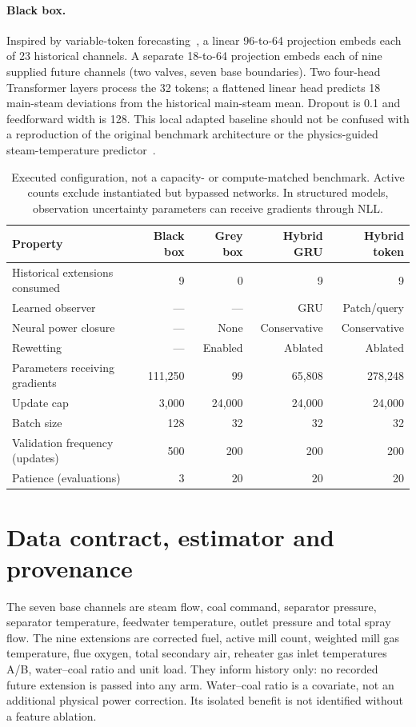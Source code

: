 \paragraph{Black box.}
Inspired by variable-token forecasting~\cite{liu2024itransformer}, a linear
96-to-64 projection embeds each of 23 historical channels. A separate 18-to-64
projection embeds each of nine supplied future channels (two valves, seven
base boundaries). Two four-head Transformer layers process the 32 tokens;
a flattened linear head predicts 18 main-steam deviations from the historical
main-steam mean. Dropout is 0.1 and feedforward width is 128. This local adapted
baseline should not be confused with a reproduction of the original benchmark
architecture or the physics-guided steam-temperature predictor~\cite{zhang2026sst}.

\begin{table}[!ht]
\centering\small
\begin{tabular}{lrrrr}
\toprule
Property & Black box & Grey box & Hybrid GRU & Hybrid token\\
\midrule
Historical extensions consumed & 9 & 0 & 9 & 9\\
Learned observer & --- & --- & GRU & Patch/query\\
Neural power closure & --- & None & Conservative & Conservative\\
Rewetting & --- & Enabled & Ablated & Ablated\\
Parameters receiving gradients & 111,250 & 99 & 65,808 & 278,248\\
Update cap & 3,000 & 24,000 & 24,000 & 24,000\\
Batch size & 128 & 32 & 32 & 32\\
Validation frequency (updates) & 500 & 200 & 200 & 200\\
Patience (evaluations) & 3 & 20 & 20 & 20\\
\bottomrule
\end{tabular}
\caption{Executed configuration, not a capacity- or compute-matched benchmark.
Active counts exclude instantiated but bypassed networks. In structured models,
observation uncertainty parameters can receive gradients through NLL.}
\end{table}

\section{Data contract, estimator and provenance}\label{app:stats}

The seven base channels are steam flow, coal command, separator pressure,
separator temperature, feedwater temperature, outlet pressure and total spray
flow. The nine extensions are corrected fuel, active mill count, weighted mill
gas temperature, flue oxygen, total secondary air, reheater gas inlet temperatures
A/B, water--coal ratio and unit load. They inform history only: no recorded
future extension is passed into any arm. Water--coal ratio is a covariate, not
an additional physical power correction. Its isolated benefit is not identified
without a feature ablation.

